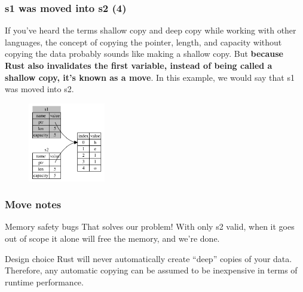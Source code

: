 \documentclass{beamer}
\begin{document}
\begin{frame}[fragile]
	\frametitle{s1 was moved into s2 (4)}
	If you’ve heard the terms shallow copy and deep copy while working with other languages, the concept of copying the pointer, length, and capacity without copying the data probably sounds like making a shallow copy. But \textbf{because Rust also invalidates the first variable, instead of being called a shallow copy, it’s known as a move}. In this example, we would say that s1 was moved into s2. 
	\begin{figure}
		\centering
		\includegraphics[width=0.3\textwidth]{./img/trpl04-04.png}
		\label{fig:figureMove}
	\end{figure}
\end{frame}

\begin{frame}[fragile]
	\frametitle{Move notes}
	
	\begin{block}{Memory safety bugs}
		That solves our problem! With only s2 valid, when it goes out of scope it alone will free the memory, and we’re done.
	\end{block}
	
	
	\begin{block}{Design choice}
		Rust will never automatically create “deep” copies of your data. Therefore, any automatic copying can be assumed to be inexpensive in terms of runtime performance.
	\end{block}
	
\end{frame}
\end{document}
